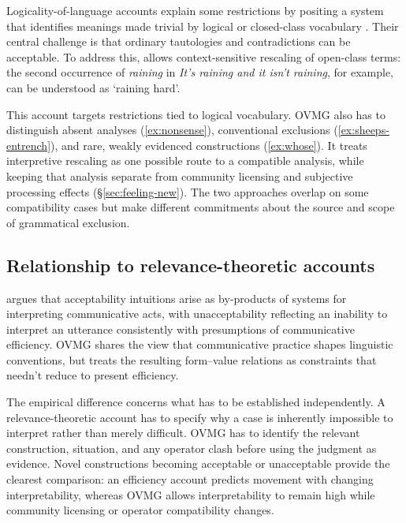 \documentclass[12pt,letterpaper]{article}
\newcommand{\mention}[1]{\textit{#1}}
\begin{document}
Logicality-of-language accounts explain some restrictions by positing a system
that identifies meanings made trivial by logical or closed-class vocabulary
\autocite{fox_economy_2000,chierchia_logic_2013,gajewski_l-triviality_2009}.
Their central challenge is that ordinary tautologies and contradictions can be
acceptable. To address this, \textcite{del_pinal_logicality_2019} allows
context-sensitive rescaling of open-class terms: the second occurrence of
\mention{raining} in \mention{It's raining and it isn't raining}, for example,
can be understood as `raining hard'.

This account targets restrictions tied to logical vocabulary. OVMG also has to
distinguish absent analyses
(\ref{ex:nonsense}), conventional exclusions (\ref{ex:sheeps-entrench}), and
rare, weakly evidenced constructions (\ref{ex:whose}). It treats interpretive
rescaling as one possible route to a compatible analysis, while keeping that
analysis separate from community licensing and subjective processing effects
(\S\ref{sec:feeling-new}). The two approaches overlap on some
compatibility cases but make different commitments about the source and scope
of grammatical exclusion.



\subsection{Relationship to relevance-theoretic accounts}

\textcite{scottphillips2024communication} argues that acceptability intuitions
arise as by-products of systems for interpreting communicative acts, with
unacceptability reflecting an inability to interpret an utterance consistently
with presumptions of communicative efficiency. OVMG shares the view that
communicative practice shapes linguistic conventions, but treats the resulting
form--value relations as constraints that needn't reduce to present efficiency.

The empirical difference concerns what has to be established independently. A
relevance-theoretic account has to specify why a case is inherently impossible to
interpret rather than merely difficult. OVMG has to identify the relevant
construction, situation, and any operator clash before using the judgment as
evidence. Novel constructions becoming acceptable or unacceptable provide the
clearest comparison: an efficiency account predicts movement with changing
interpretability, whereas OVMG allows interpretability to remain high while
community licensing or operator compatibility changes.
\end{document}

